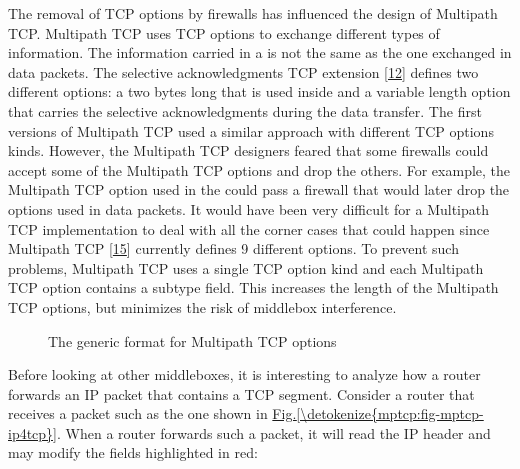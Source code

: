 \documentclass[letterpaper,10pt,english]{sphinxmanual}
\begin{document}
\sphinxAtStartPar
The removal of TCP options by firewalls has influenced the design of Multipath TCP. Multipath TCP uses TCP options to exchange different types of information. The information carried in a  is not the same as the one exchanged in data packets. The selective acknowledgments TCP extension {[}\hyperlink{cite.biblio:id1948}{12}{]} defines two different options: a two bytes long  that is used inside  and a variable length  option that carries the selective acknowledgments during the data transfer. The first versions of Multipath TCP used a similar approach with different TCP options kinds. However, the Multipath TCP designers feared that some firewalls could accept some of the Multipath TCP options and drop the others. For example, the Multipath TCP option used in the  could pass a firewall that would later drop the options used in data packets. It would have been very difficult for a Multipath TCP implementation to deal with all the corner cases that could happen since Multipath TCP {[}\hyperlink{cite.biblio:id8500}{15}{]} currently defines 9 different options. To prevent such problems, Multipath TCP uses a single TCP option kind and each Multipath TCP option contains a subtype field. This increases the length of the Multipath TCP options, but minimizes the risk of middlebox interference.
\begin{figure}[htbp]\centering\capstart{}\caption{The generic format for Multipath TCP options}\label{\detokenize{mptcp:id77}}\label{\detokenize{mptcp:fig-mptcp-tcp-option2}}\end{figure}
\sphinxAtStartPar
Before looking at other middleboxes, it is interesting to analyze how a router forwards an IP packet that contains a TCP segment. Consider a router that receives a packet such as the one shown in \hyperref[\detokenize{mptcp:fig-mptcp-ip4tcp}]{Fig.\@ \ref{\detokenize{mptcp:fig-mptcp-ip4tcp}}}. When a router forwards such a packet, it will read the IP header and may modify the fields highlighted in red:
\end{document}

